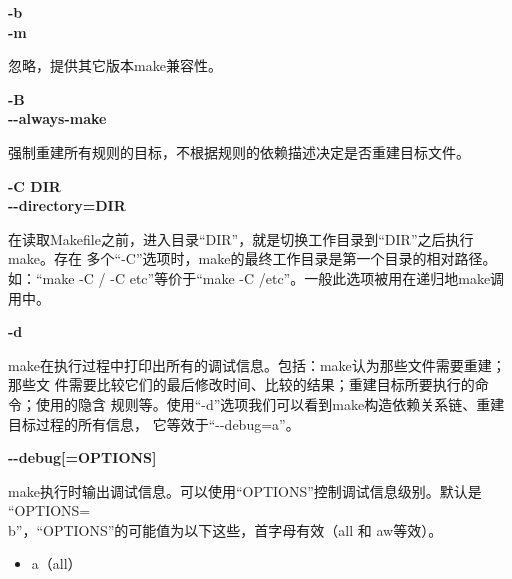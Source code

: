 \begin{dinglist}{47}
\itemsep=4pt
  \item \begin{minipage}[t]{\linewidth}
          \textbf{-b} \\
          \textbf{-m}
        \end{minipage}

忽略，提供其它版本make兼容性。

  \item \begin{minipage}[t]{\linewidth}
          \textbf{-B} \\
          \textbf{-{}-always-make}
        \end{minipage}

强制重建所有规则的目标，不根据规则的依赖描述决定是否重建目标文件。

  \item \begin{minipage}[t]{\linewidth}
          \textbf{-C DIR} \\
          \textbf{-{}-directory=DIR}
        \end{minipage}

在读取Makefile之前，进入目录“DIR”，就是切换工作目录到“DIR”之后执行make。存在
多个“-C”选项时，make的最终工作目录是第一个目录的相对路径。如：“make -C / -C
etc”等价于“make -C /etc”。一般此选项被用在递归地make调用中。

  \item \begin{minipage}[t]{\linewidth}
          \textbf{-d}
        \end{minipage}

make在执行过程中打印出所有的调试信息。包括：make认为那些文件需要重建；那些文
件需要比较它们的最后修改时间、比较的结果；重建目标所要执行的命令；使用的隐含
规则等。使用“-d”选项我们可以看到make构造依赖关系链、重建目标过程的所有信息，
它等效于“-{}-debug=a”。

  \item \begin{minipage}[t]{\linewidth}
          \textbf{-{}-debug[=OPTIONS]}
        \end{minipage}

make执行时输出调试信息。可以使用“OPTIONS”控制调试信息级别。默认是%
“OPTIONS=\\%
b”，“OPTIONS”的可能值为以下这些，首字母有效（all 和 aw等效）。

\begin{itemize}
\item a（all）


\end{itemize}
\end{dinglist}
